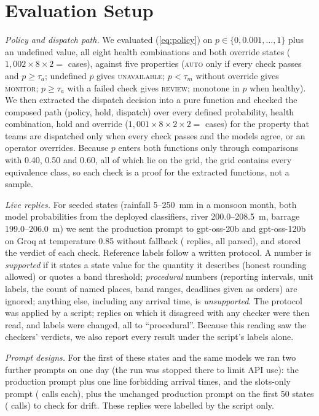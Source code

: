 \documentclass[conference]{IEEEtran}
\begin{document}
\section{Evaluation Setup}
\textit{Policy and dispatch path.} We evaluated (\ref{eq:policy}) on $p\in\{0,0.001,\dots,1\}$ plus an undefined value, all eight health combinations and both override states ($1{,}002\times8\times2=$ \PolCases{} cases), against five properties (\textsc{auto} only if every check passes and $p\ge\tau_a$; undefined $p$ gives \textsc{unavailable}; $p<\tau_m$ without override gives \textsc{monitor}; $p\ge\tau_a$ with a failed check gives \textsc{review}; monotone in $p$ when healthy). We then extracted the dispatch decision into a pure function and checked the composed path (policy, hold, dispatch) over every defined probability, health combination, hold and override ($1{,}001\times8\times2\times2=$ \EtoECases{} cases) for the property that teams are dispatched only when every check passes and the models agree, or an operator overrides. Because $p$ enters both functions only through comparisons with 0.40, 0.50 and 0.60, all of which lie on the grid, the grid contains every equivalence class, so each check is a proof for the extracted functions, not a sample.

\textit{Live replies.} For \LiveStates{} seeded states (rainfall 5--250~mm in a monsoon month, both model probabilities from the deployed classifiers, river 200.0--208.5~m, barrage 199.0--206.0~m) we sent the production prompt to gpt-oss-20b and gpt-oss-120b on Groq at temperature 0.85 without fallback (\LiveN{} replies, all parsed), and stored the verdict of each check. Reference labels follow a written protocol. A number is \emph{supported} if it states a state value for the quantity it describes (honest rounding allowed) or quotes a band threshold; \emph{procedural} numbers (reporting intervals, unit labels, the count of named places, band ranges, deadlines given as orders) are ignored; anything else, including any arrival time, is \emph{unsupported}. The protocol was applied by a script; replies on which it disagreed with any checker were then read, and \LiveOverrides{} labels were changed, all to ``procedural''. Because this reading saw the checkers' verdicts, we also report every result under the script's labels alone.

\textit{Prompt designs.} For the first \VarStates{} of these states and the same models we ran two further prompts on one day (the run was stopped there to limit API use): the production prompt plus one line forbidding arrival times, and the slots-only prompt (\VarN{} calls each), plus the unchanged production prompt on the first 50 states (\VarBaseN{} calls) to check for drift. These replies were labelled by the script only.
\end{document}
